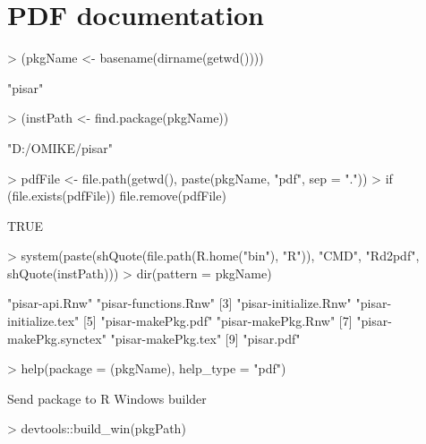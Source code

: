 \documentclass[a4paper,12pt]{article}\usepackage[]{graphicx}\usepackage[]{color}
\begin{document}
\section{PDF documentation}

\begin{Schunk}
\begin{Sinput}
> (pkgName <- basename(dirname(getwd())))
\end{Sinput}
\begin{Soutput}
[1] "pisar"
\end{Soutput}
\begin{Sinput}
> (instPath <- find.package(pkgName))
\end{Sinput}
\begin{Soutput}
[1] "D:/OMIKE/pisar"
\end{Soutput}
\begin{Sinput}
> pdfFile <- file.path(getwd(), paste(pkgName, "pdf", sep = "."))
> if (file.exists(pdfFile)) file.remove(pdfFile)
\end{Sinput}
\begin{Soutput}
[1] TRUE
\end{Soutput}
\begin{Sinput}
> system(paste(shQuote(file.path(R.home("bin"), "R")), "CMD", "Rd2pdf", shQuote(instPath)))
> dir(pattern = pkgName)
\end{Sinput}
\begin{Soutput}
[1] "pisar-api.Rnw"         "pisar-functions.Rnw"  
[3] "pisar-initialize.Rnw"  "pisar-initialize.tex" 
[5] "pisar-makePkg.pdf"     "pisar-makePkg.Rnw"    
[7] "pisar-makePkg.synctex" "pisar-makePkg.tex"    
[9] "pisar.pdf"            
\end{Soutput}
\end{Schunk}

\begin{Schunk}
\begin{Sinput}
> help(package = (pkgName), help_type = "pdf")
\end{Sinput}
\end{Schunk}

Send package to R Windows builder

\begin{Schunk}
\begin{Sinput}
> devtools::build_win(pkgPath)
\end{Sinput}
\end{Schunk}

%
%
\end{document}
